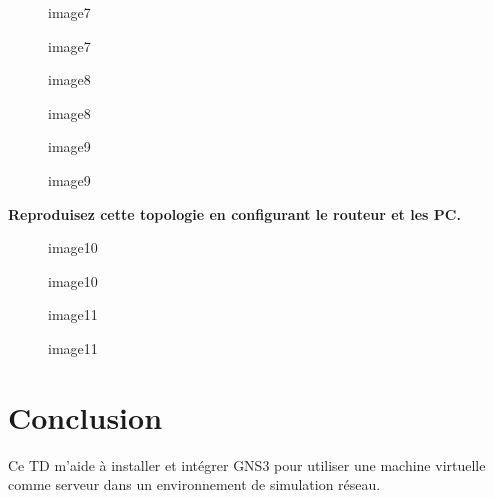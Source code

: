 \documentclass[
]{article}
\begin{document}
\begin{figure}
\centering
{image7}
\caption{image7}
\end{figure}

\begin{figure}
\centering
{image8}
\caption{image8}
\end{figure}

\begin{figure}
\centering
{image9}
\caption{image9}
\end{figure}

\textbf{Reproduisez cette topologie en configurant le routeur et les
PC.}

\begin{figure}
\centering
{image10}
\caption{image10}
\end{figure}

\begin{figure}
\centering
{image11}
\caption{image11}
\end{figure}

\section{Conclusion}\label{conclusion}

Ce TD m’aide à installer et intégrer GNS3 pour utiliser une machine
virtuelle comme serveur dans un environnement de simulation réseau.
\end{document}
